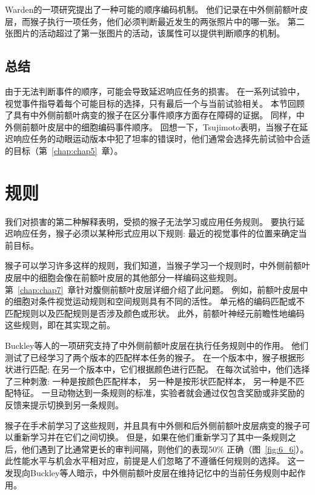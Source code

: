 Warden\cite{warden2007representation}的一项研究提出了一种可能的顺序编码机制。
他们记录在中外侧前额叶皮层，而猴子执行一项任务，他们必须判断最近发生的两张照片中的哪一张。
第二张图片的活动超过了第一张图片的活动，该属性可以提供判断顺序的机制。



\subsection{总结}

由于无法判断事件的顺序，可能会导致延迟响应任务的损害。
在一系列试验中，视觉事件指导着每个可能目标的选择，只有最后一个与当前试验相关。
本节回顾了具有中外侧前额叶病变的猴子在区分事件顺序方面存在障碍的证据。
同样，中外侧前额叶皮层中的细胞编码事件顺序。
回想一下，Tsujimoto\cite{tsujimoto2012prefrontal}表明，当猴子在延迟响应任务的动眼运动版本中犯了坦率的错误时，他们通常会选择先前试验中合适的目标（第~\ref{chap:chap5}~章）。



\section{规则}

我们对损害的第二种解释表明，受损的猴子无法学习或应用任务规则。
要执行延迟响应任务，猴子必须以某种形式应用以下规则: 最近的视觉事件的位置来确定当前目标。


猴子可以学习许多这样的规则，我们知道，当猴子学习一个规则时，中外侧前额叶皮层中的细胞会像在前额叶皮层的其他部分一样编码这些规则。
第~\ref{chap:chap7}~章针对腹侧前额叶皮层详细介绍了此问题。
例如，前额叶皮层中的细胞对条件视觉运动规则和空间规则\cite{wise1999role}具有不同的活性。
单元格的编码匹配或不匹配规则\cite{wallis2001single}以及匹配规则是否涉及颜色或形状\cite{mansouri2006prefrontal}。
此外，前额叶神经元前瞻性地编码这些规则，即在其实现之前\cite{wallis2001single}。


Buckley等人\cite{buckley2009dissociable}的一项研究支持了中外侧前额叶皮层在执行任务规则中的作用。
他们测试了已经学习了两个版本的匹配样本任务的猴子。
在一个版本中，猴子根据形状进行匹配; 
在另一个版本中，它们根据颜色进行匹配。
在每次试验中，他们选择了三种刺激: 
一种是按颜色匹配样本，
另一种是按形状匹配样本，
另一种是不匹配特征。
一旦动物达到一条规则的标准，实验者就会通过仅包含奖励或非奖励的反馈来提示切换到另一条规则。


猴子在手术前学习了这些规则，并且具有中外侧和后外侧前额叶皮层病变的猴子可以重新学习并在它们之间切换。
但是，如果在他们重新学习了其中一条规则之后，他们遇到了比通常更长的审判间隔，则他们的表现50\% 正确\cite{buckley2009dissociable}（图~\ref{fig:6_6}）。
此性能水平与机会水平相对应，前提是人们忽略了不遵循任何规则的选择。
这一发现向Buckley等人暗示，中外侧前额叶皮层在维持记忆中的当前任务规则中起作用。


